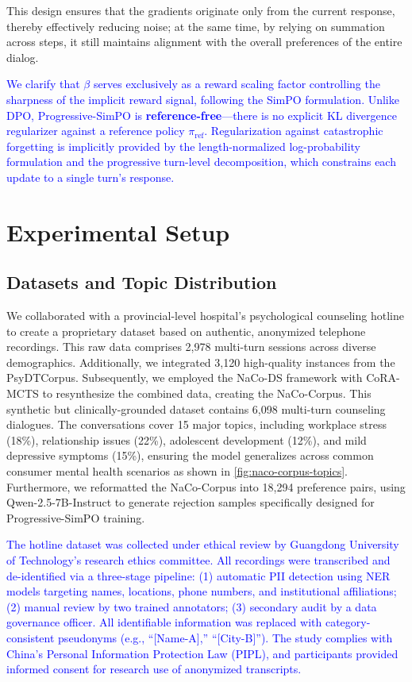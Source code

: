 \documentclass[lettersize,journal]{IEEEtran}
\newcommand{\blue}[1]{\textcolor{blue}{#1}}
\begin{document}
This design ensures that the gradients originate only from the current response, thereby effectively reducing noise;
at the same time, by relying on summation across steps, it still maintains alignment with the overall preferences of the entire dialog.

\blue{We clarify that $\beta$ serves exclusively as a reward scaling factor controlling the sharpness of the implicit reward signal, following the SimPO formulation. Unlike DPO, Progressive-SimPO is \textbf{reference-free}---there is no explicit KL divergence regularizer against a reference policy $\pi_{\text{ref}}$. Regularization against catastrophic forgetting is implicitly provided by the length-normalized log-probability formulation and the progressive turn-level decomposition, which constrains each update to a single turn's response.}

\section{Experimental Setup}

\subsection{Datasets and Topic Distribution}
We collaborated with a provincial-level hospital's psychological counseling hotline to create a proprietary dataset based on authentic, anonymized telephone recordings. This raw data comprises 2,978 multi-turn sessions across diverse demographics. Additionally, we integrated 3,120 high-quality instances from the PsyDTCorpus. 
Subsequently, we employed the NaCo-DS framework with CoRA-MCTS to resynthesize the combined data, creating the NaCo-Corpus. This synthetic but clinically-grounded dataset contains 6,098 multi-turn counseling dialogues. The conversations cover 15 major topics, including workplace stress (18\%), relationship issues (22\%), adolescent development (12\%), and mild depressive symptoms (15\%), ensuring the model generalizes across common consumer mental health scenarios as shown in \cref{fig:naco-corpus-topics}.
Furthermore, we reformatted the NaCo-Corpus into 18,294 preference pairs, using Qwen-2.5-7B-Instruct to generate rejection samples specifically designed for Progressive-SimPO training.

\blue{The hotline dataset was collected under ethical review by Guangdong University of Technology's research ethics committee. All recordings were transcribed and de-identified via a three-stage pipeline: (1) automatic PII detection using NER models targeting names, locations, phone numbers, and institutional affiliations; (2) manual review by two trained annotators; (3) secondary audit by a data governance officer. All identifiable information was replaced with category-consistent pseudonyms (e.g., ``[Name-A],'' ``[City-B]''). The study complies with China's Personal Information Protection Law (PIPL), and participants provided informed consent for research use of anonymized transcripts.}
\end{document}
